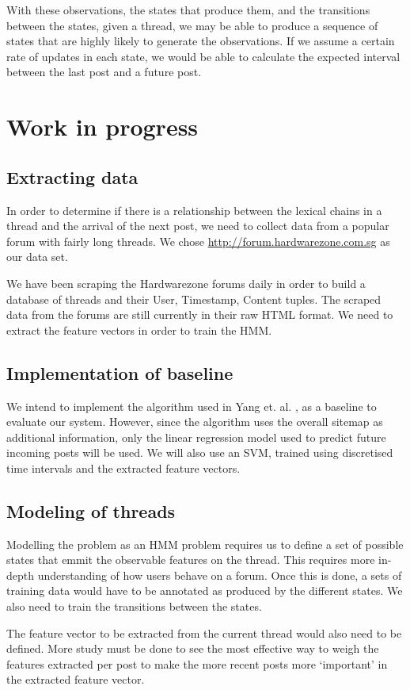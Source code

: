 \documentclass[12 pt]{article}
\begin{document}
With these observations, the states that produce them, and the transitions between the states, given a thread, we may be able to produce a sequence of states that are highly likely to generate the observations. If we assume a certain rate of updates in each state, we would be able to calculate the expected interval between the last post and a future post.


\section{Work in progress}
\subsection{Extracting data}
In order to determine if there is a relationship between the lexical chains in a thread and the arrival of the next post, we need to collect data from a popular forum with fairly long threads. We chose \url{http://forum.hardwarezone.com.sg} as our data set.

We have been scraping the Hardwarezone forums daily in order to build a database of threads and their User, Timestamp, Content tuples. The scraped data from the forums are still currently in their raw HTML format. We need to extract the feature vectors in order to train the HMM.
\subsection{Implementation of baseline}
We intend to implement the algorithm used in Yang et. al. \cite{Yang2009}, as a baseline to evaluate our system. However, since the algorithm uses the overall sitemap as additional information, only the linear regression model used to predict future incoming posts will be used. We will also use an SVM, trained using discretised time intervals and the extracted feature vectors.

\subsection{Modeling of threads}
Modelling the problem as an HMM problem requires us to define a set of possible states that emmit the observable features on the thread. This requires more in-depth understanding of how users behave on a forum. Once this is done, a sets of training data would have to be annotated as produced by the different states. We also need to train the transitions between the states.

The feature vector to be extracted from the current thread would also need to be defined. More study must be done to see the most effective way to weigh the features extracted per post to make the more recent posts more `important' in the extracted feature vector.
\end{document}
